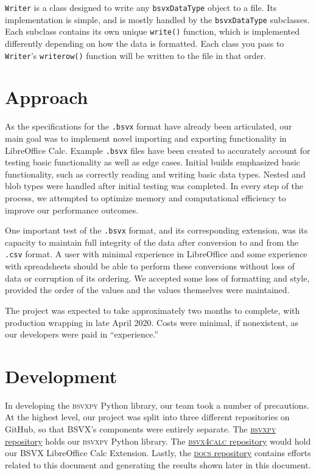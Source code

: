 \documentclass[10pt]{article}
\begin{document}
\indent{}
\texttt{Writer} is a class designed to write any \texttt{bsvxDataType} object to a file.
Its implementation is simple, and is mostly handled by the \texttt{bsvxDataType} subclasses.
Each subclass contains its own unique \texttt{write()} function, which is implemented differently depending on how the data is formatted.
Each class you pass to \texttt{Writer}’s \texttt{writerow()} function will be written to the file in that order. 

\section*{Approach}

As the specifications for the \texttt{.bsvx} format have already been articulated, our main goal was to implement novel importing and exporting functionality in LibreOffice Calc.
Example \texttt{.bsvx} files have been created to accurately account for testing basic functionality as well as edge cases.
Initial builds emphasized basic functionality, such as correctly reading and writing basic data types.
Nested and blob types were handled after initial testing was completed.
In every step of the process, we attempted to optimize memory and computational efficiency to improve our performance outcomes.

\indent{}
One important test of the \texttt{.bsvx} format, and its corresponding extension, was its capacity to maintain full integrity of the data after conversion to and from the \texttt{.csv} format.
A user with minimal experience in LibreOffice and some experience with spreadsheets should be able to perform these conversions without loss of data or corruption of its ordering.
We accepted some loss of formatting and style, provided the order of the values and the values themselves were maintained.

\indent{}
The project was expected to take approximately two months to complete, with production wrapping in late April 2020.
Costs were minimal, if nonexistent, as our developers were paid in “experience.”

\section*{Development}

In developing the \textsc{bsvxpy} Python library, our team took a number of precautions.
At the highest level, our project was split into three different repositories on GitHub, so that BSVX's components were entirely separate.
The \href{https://github.com/bsvx/bsvxpy}{\textsc{bsvxpy} repository} holds our \textsc{bsvxpy} Python library.
The \href{https://github.com/bsvx/bsvx4calc}{\textsc{bsvx4calc} repository} would hold our BSVX LibreOffice Calc Extension.
Lastly, the \href{https://github.com/bsvx/docs}{\textsc{docs} repository} contains efforts related to this document and generating the results shown later in this document.
\end{document}
